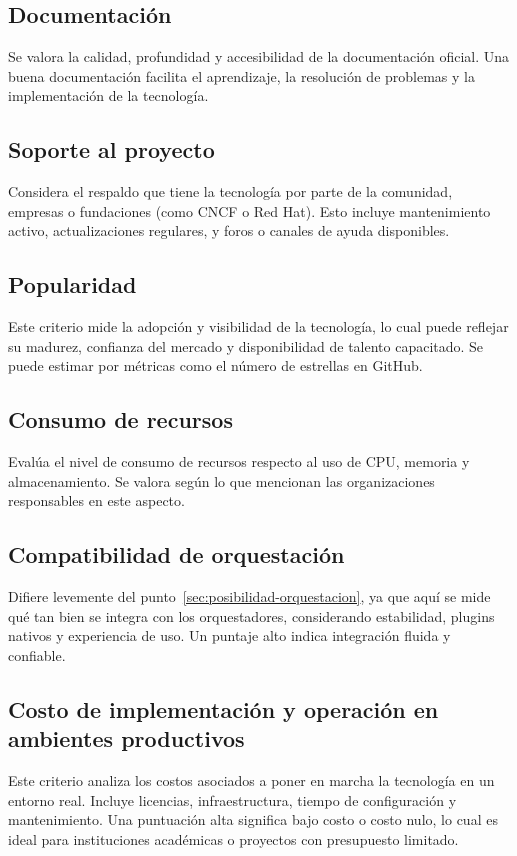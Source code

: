 \subsection{Documentación}
\noindent
Se valora la calidad, profundidad y accesibilidad de la documentación oficial. Una buena documentación facilita el aprendizaje, la resolución de problemas y la implementación de la tecnología.

\subsection{Soporte al proyecto}
\noindent
Considera el respaldo que tiene la tecnología por parte de la comunidad, empresas o fundaciones (como CNCF o Red Hat). Esto incluye mantenimiento activo, actualizaciones regulares, y foros o canales de ayuda disponibles.

\subsection{Popularidad}
\noindent
Este criterio mide la adopción y visibilidad de la tecnología, lo cual puede reflejar su madurez, confianza del mercado y disponibilidad de talento capacitado. Se puede estimar por métricas como el número de estrellas en GitHub.

\subsection{Consumo de recursos}
\noindent
Evalúa el nivel de consumo de recursos respecto al uso de CPU, memoria y almacenamiento. Se valora según lo que mencionan las organizaciones responsables en este aspecto.

\subsection{Compatibilidad de orquestación}
\noindent
Difiere levemente del punto~\ref{sec:posibilidad-orquestacion}, ya que aquí se mide qué tan bien se integra con los orquestadores, considerando estabilidad, plugins nativos y experiencia de uso. Un puntaje alto indica integración fluida y confiable.

\subsection{Costo de implementación y operación en ambientes productivos}
\noindent
Este criterio analiza los costos asociados a poner en marcha la tecnología en un entorno real. Incluye licencias, infraestructura, tiempo de configuración y mantenimiento. Una puntuación alta significa bajo costo o costo nulo, lo cual es ideal para instituciones académicas o proyectos con presupuesto limitado.
